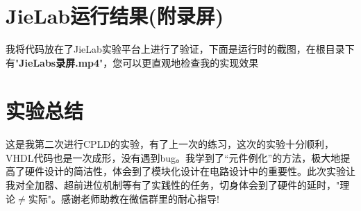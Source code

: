 \documentclass[UTF8, onecolumn, a4paper]{article}
\begin{document}
\section{JieLab运行结果(附录屏)}
我将代码放在了JieLab实验平台上进行了验证，下面是运行时的截图，在根目录下有"\textbf{JieLabs录屏.mp4}"，您可以更直观地检查我的实现效果
\begin{figure}[htb]
	\centering
\end{figure}
\section{实验总结}
\paragraph*{}
这是我第二次进行CPLD的实验，有了上一次的练习，这次的实验十分顺利，VHDL代码也是一次成形，没有遇到bug。我学到了“元件例化”的方法，极大地提高了硬件设计的简洁性，体会到了模块化设计在电路设计中的重要性。此次实验让我对全加器、超前进位机制等有了实践性的任务，切身体会到了硬件的延时，"理论$\neq$实际"。感谢老师助教在微信群里的耐心指导!
\end{document}
